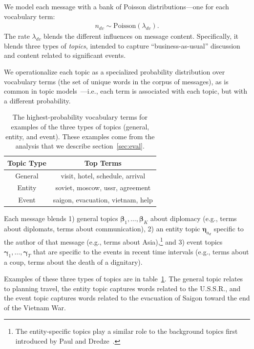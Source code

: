 We model each message with a bank of Poisson distributions---one for
each vocabulary term:
\begin{align}
  n_{dv} \sim \textrm{Poisson}\left(\lambda_{dv}\right).
\end{align}
The rate $\lambda_{dv}$ blends the different influences on message
content. Specifically, it blends three types of \emph{topics},
intended to capture ``business-as-usual'' discussion and content
related to significant events.

We operationalize each topic as a specialized probability distribution
over vocabulary terms (the set of unique words in the corpus of
messages), as is common in topic
models~\cite{Blei:2003,canny2004gap,Gopalan:2014b}---i.e., each term
is associated with each topic, but with a different probability.

\begin{table}
\centering
\small
\begin{tabular}{cc}
\toprule
Topic Type & Top Terms \\
\midrule
General & visit, hotel, schedule, arrival \\
Entity & soviet, moscow, ussr, agreement \\
Event & saigon, evacuation, vietnam, help \\
\bottomrule
\end{tabular}
\caption{The highest-probability vocabulary terms for examples of the
  three types of topics (general, entity, and event). These examples
  come from the analysis that we describe section~\ref{sec:eval}.}
\label{tab:3topics}
\end{table}

Each message blends 1) general topics $\mathbold{\beta}_1, \ldots,
\mathbold{\beta}_K$ about diplomacy (e.g., terms about diplomats,
terms about communication), 2) an entity topic $\mathbold{\eta}_{a_d}$
specific to the author of that message (e.g., terms about
Asia),\footnote{The entity-specific topics play a similar role to the
  background topics first introduced by Paul and
  Dredze~.} and 3) event topics
$\mathbold{\gamma}_1, \ldots, \mathbold{\gamma}_T$ that are specific
to the events in recent time intervals (e.g., terms about a coup,
terms about the death of a dignitary).

Examples of these three types of topics are in
table~\ref{tab:3topics}. The general topic relates to planning travel,
the entity topic captures words related to the U.S.S.R., and the event
topic captures words related to the evacuation of Saigon toward the
end of the Vietnam War.

